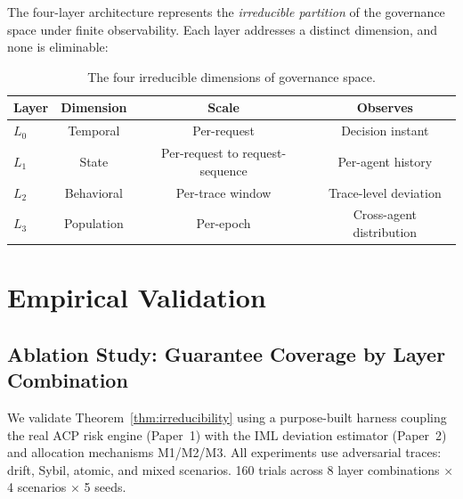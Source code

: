 \documentclass[11pt]{article}
\newcommand{\Layer}[1]{L_{#1}}
\begin{document}
The four-layer architecture represents the \emph{irreducible partition} of the governance space under finite observability. Each layer addresses a distinct dimension, and none is eliminable:

\begin{table}[h]
\centering
\small
\caption{The four irreducible dimensions of governance space.}
\label{tab:dimensions}
\begin{tabular}{lccc}
\toprule
\textbf{Layer} & \textbf{Dimension} & \textbf{Scale} & \textbf{Observes} \\
\midrule
$\Layer{0}$ & Temporal & Per-request & Decision instant \\
$\Layer{1}$ & State & Per-request to request-sequence & Per-agent history \\
$\Layer{2}$ & Behavioral & Per-trace window & Trace-level deviation \\
$\Layer{3}$ & Population & Per-epoch & Cross-agent distribution \\
\bottomrule
\end{tabular}
\end{table}

\section{Empirical Validation}
\label{sec:empirical}

\subsection{Ablation Study: Guarantee Coverage by Layer Combination}

We validate Theorem~\ref{thm:irreducibility} using a purpose-built harness coupling the real ACP risk engine (Paper~1) with the IML deviation estimator (Paper~2) and allocation mechanisms M1/M2/M3. All experiments use adversarial traces: drift, Sybil, atomic, and mixed scenarios. 160 trials across 8 layer combinations $\times$ 4 scenarios $\times$ 5 seeds.
\end{document}
